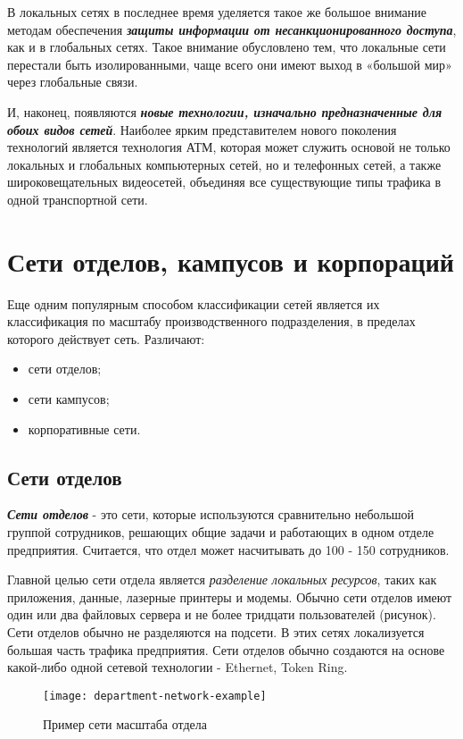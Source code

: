 В локальных сетях в последнее время уделяется такое же большое внимание методам обеспечения \textbf{\textit{защиты информации от несанкционированного доступа}}, как и в глобальных сетях.
Такое внимание обусловлено тем, что локальные сети перестали быть изолированными, чаще всего они имеют выход в «большой мир» через глобальные связи.

И, наконец, появляются \textbf{\textit{новые технологии, изначально предназначенные для обоих видов сетей}}.
Наиболее ярким представителем нового поколения технологий является технология АТМ, которая может служить основой не только локальных и глобальных компьютерных сетей, но и телефонных сетей, а также широковещательных видеосетей, объединяя все существующие типы трафика в одной транспортной сети.

\section{Сети отделов, кампусов и корпораций}

Еще одним популярным способом классификации сетей является их классификация по масштабу производственного подразделения, в пределах которого действует сеть.
Различают:
\begin{itemize}
    \item сети отделов;
    \item сети кампусов;
    \item корпоративные сети.
\end{itemize}

\subsection{Сети отделов}

\textbf{\textit{Сети отделов}} - это сети, которые используются сравнительно небольшой группой сотрудников, решающих общие задачи и работающих в одном отделе предприятия.
Считается, что отдел может насчитывать до 100 - 150  сотрудников.

Главной целью сети отдела является \emph{разделение локальных ресурсов}, таких как приложения, данные, лазерные принтеры и модемы.
Обычно сети отделов имеют один или два файловых сервера и не более тридцати пользователей (рисунок).
Сети отделов обычно не разделяются на подсети.
В этих сетях локализуется большая часть трафика предприятия.
Сети отделов обычно создаются на основе какой-либо одной сетевой технологии - Ethernet, Token Ring.
\begin{figure}[!ht]
    \centering
    \texttt{[image: department-network-example]}
    \caption{Пример сети масштаба отдела}
    \label{fig:department-network-example}
\end{figure}

